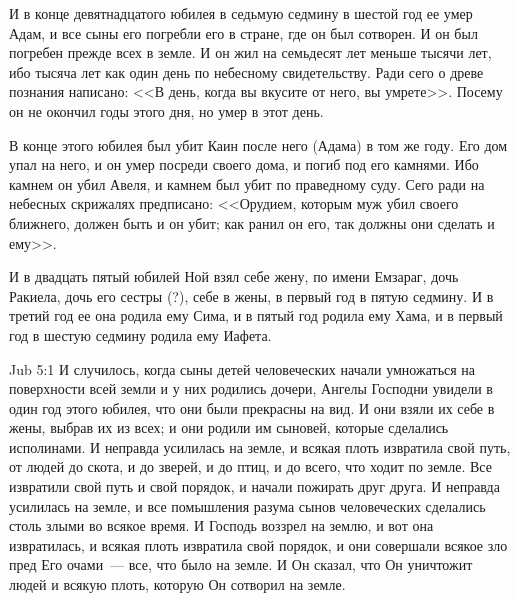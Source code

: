 И в конце девятнадцатого юбилея в седьмую седмину в шестой год ее умер Адам,
и все сыны его погребли его в стране, где он был сотворен. И он был погребен
прежде всех в земле. И он жил на семьдесят лет меньше тысячи лет, ибо тысяча
лет как один день по небесному свидетельству. Ради сего о древе познания
написано: <<В день, когда вы вкусите от него, вы умрете>>. Посему он не
окончил годы этого дня, но умер в этот день.

В конце этого юбилея был убит Каин после него (Адама) в том же году. Его дом
упал на него, и он умер посреди своего дома, и погиб под его камнями. Ибо
камнем он убил Авеля, и камнем был убит по праведному суду. Сего ради на
небесных скрижалях предписано: <<Орудием, которым муж убил своего ближнего,
должен быть и он убит; как ранил он его, так должны они сделать и
ему>>.

И в двадцать пятый юбилей Ной взял себе жену, по имени Емзараг, дочь
Ракиела, дочь его сестры (?), себе в жены, в первый год в пятую седмину. И в
третий год ее она родила ему Сима, и в пятый год родила ему Хама, и в первый
год в шестую седмину родила ему Иафета.

\vs Jub 5:1
И случилось, когда сыны детей человеческих начали умножаться на поверхности
всей земли и у них родились дочери, Ангелы Господни увидели в один год этого
юбилея, что они были прекрасны на вид. И они взяли их себе в жены, выбрав их из
всех; и они родили им сыновей, которые сделались исполинами. И неправда
усилилась на земле, и всякая плоть извратила свой путь, от людей до скота, и до
зверей, и до птиц, и до всего, что ходит по земле. Все извратили свой путь и
свой порядок, и начали пожирать друг друга. И неправда усилилась на земле, и
все помышления разума сынов человеческих сделались столь злыми во всякое время.
И Господь воззрел на землю, и вот она извратилась, и всякая плоть извратила
свой порядок, и они совершали всякое зло пред Его очами~--- все, что было на
земле. И Он сказал, что Он уничтожит людей и всякую плоть, которую Он сотворил
на земле.


